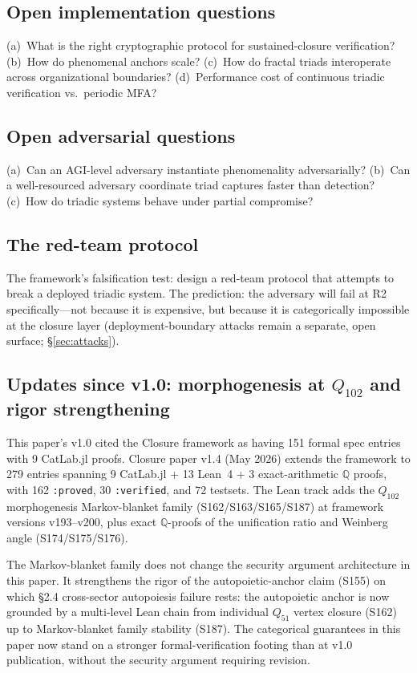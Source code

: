 \documentclass[11pt,a4paper]{article}
\theoremstyle{definition}
\theoremstyle{remark}
\begin{document}
\subsection{Open implementation questions}

(a)~What is the right cryptographic protocol for sustained-closure verification? (b)~How do phenomenal anchors scale? (c)~How do fractal triads interoperate across organizational boundaries? (d)~Performance cost of continuous triadic verification vs.\ periodic MFA?

\subsection{Open adversarial questions}

(a)~Can an AGI-level adversary instantiate phenomenality adversarially? (b)~Can a well-resourced adversary coordinate triad captures faster than detection? (c)~How do triadic systems behave under partial compromise?

\subsection{The red-team protocol}

The framework's falsification test: design a red-team protocol that attempts to break a deployed triadic system. The prediction: the adversary will fail at R2 specifically---not because it is expensive, but because it is categorically impossible at the closure layer (deployment-boundary attacks remain a separate, open surface; \S\ref{sec:attacks}).

\subsection{Updates since v1.0: morphogenesis at $Q_{102}$ and rigor strengthening}

This paper's v1.0 cited the Closure framework as having 151 formal spec entries with 9 CatLab.jl proofs. Closure paper v1.4 (May 2026) extends the framework to 279 entries spanning 9 CatLab.jl + 13 Lean~4 + 3 exact-arithmetic $\mathbb{Q}$ proofs, with 162 \texttt{:proved}, 30 \texttt{:verified}, and 72 testsets. The Lean track adds the $Q_{102}$ morphogenesis Markov-blanket family (S162/S163/S165/S187) at framework versions v193--v200, plus exact $\mathbb{Q}$-proofs of the unification ratio and Weinberg angle (S174/S175/S176).

The Markov-blanket family does not change the security argument architecture in this paper. It strengthens the rigor of the autopoietic-anchor claim (S155) on which §2.4 cross-sector autopoiesis failure rests: the autopoietic anchor is now grounded by a multi-level Lean chain from individual $Q_{51}$ vertex closure (S162) up to Markov-blanket family stability (S187). The categorical guarantees in this paper now stand on a stronger formal-verification footing than at v1.0 publication, without the security argument requiring revision.
\end{document}

